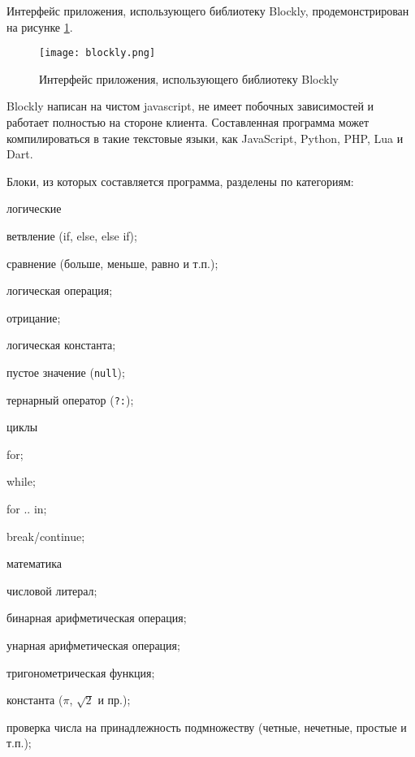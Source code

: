 Интерфейс приложения, использующего библиотеку Blockly, продемонстрирован на рисунке \ref{fig:blockly}.

\begin{figure}[htbp]
	\centering
	\texttt{[image: blockly.png]}
	\caption{Интерфейс приложения, использующего библиотеку Blockly}%
	\label{fig:blockly}
\end{figure}

Blockly написан на чистом javascript, не имеет побочных зависимостей и работает полностью на стороне клиента. Составленная программа может компилироваться в такие текстовые языки, как JavaScript, Python, PHP, Lua и Dart.

Блоки, из которых составляется программа, разделены по категориям:

\begin{itemize*}
	\item логические
	\begin{itemize*}
		\item ветвление (if, else, else if);
		\item сравнение (больше, меньше, равно и т.п.);
		\item логическая операция;
		\item отрицание;
		\item логическая константа;
		\item пустое значение (\lstinline|null|);
		\item тернарный оператор (\lstinline|?:|);	
	\end{itemize*}
	\item циклы
	\begin{itemize*}
		\item for;
		\item while;
		\item for .. in;
		\item break/continue;
	\end{itemize*}
	\item математика
	\begin{itemize*}
		\item числовой литерал;
		\item бинарная арифметическая операция;
		\item унарная арифметическая операция;
		\item тригонометрическая функция;
		\item константа ($\pi$, $\sqrt{2}$ и пр.);
		\item проверка числа на принадлежность подмножеству (четные, нечетные, простые и т.п.);

\end{itemize*}
\end{itemize*}
